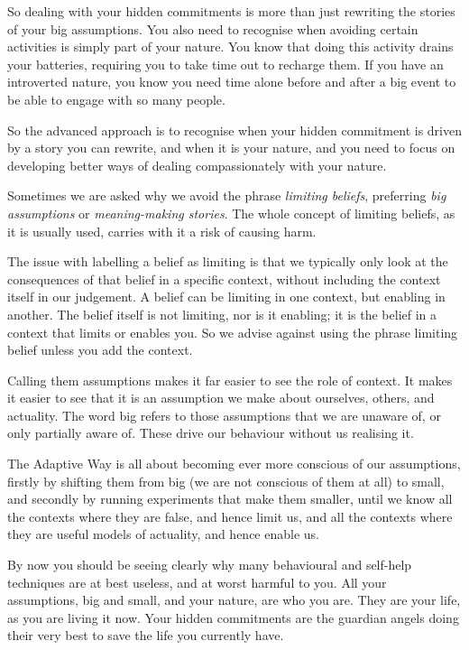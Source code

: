 So dealing with your hidden commitments is more than just rewriting the stories of your big assumptions. You also need to recognise when avoiding certain activities is simply part of your nature. You know that doing this activity drains your batteries, requiring you to take time out to recharge them. If you have an introverted nature, you know you need time alone before and after a big event to be able to engage with so many people. 


So the advanced approach is to recognise when your hidden commitment is driven by a story you can rewrite, and when it is your nature, and you need to focus on developing better ways of dealing compassionately with your nature. 


Sometimes we are asked why we avoid the phrase \emph{limiting beliefs}, preferring \emph{big assumptions} or \emph{meaning-making stories}. The whole concept of limiting beliefs, as it is usually used, carries with it a risk of causing harm. 


The issue with labelling a belief as limiting is that we typically only look at the consequences of that belief in a specific context, without including the context itself in our judgement. A belief can be limiting in one context, but enabling in another. The belief itself is not limiting, nor is it enabling; it is the belief in a context that limits or enables you. So we advise against using the phrase limiting belief unless you add the context.


Calling them assumptions makes it far easier to see the role of context. It makes it easier to see that it is an assumption we make about ourselves, others, and actuality. The word big refers to those assumptions that we are unaware of, or only partially aware of. These drive our behaviour without us realising it.


The Adaptive Way is all about becoming ever more conscious of our assumptions, firstly by shifting them from big (we are not conscious of them at all) to small, and secondly by running experiments that make them smaller, until we know all the contexts where they are false, and hence limit us, and all the contexts where they are useful models of actuality, and hence enable us.


By now you should be seeing clearly why many behavioural and self-help techniques are at best useless, and at worst harmful to you. All your assumptions, big and small, and your nature, are who you are. They are your life, as you are living it now. Your hidden commitments are the guardian angels doing their very best to save the life you currently have. 


